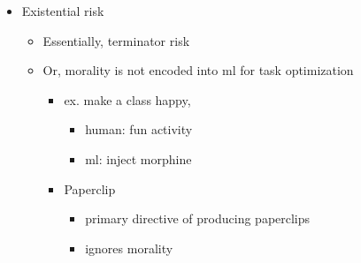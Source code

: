 \documentclass[letterpaper]{article}
\begin{document}
\begin{itemize}
\item Existential risk

\begin{itemize}
\item Essentially, terminator risk
\item Or, morality is not encoded into ml for task optimization

\begin{itemize}
\item ex. make a class happy,

\begin{itemize}
\item human: fun activity
\item ml: inject morphine
\end{itemize}

\item Paperclip

\begin{itemize}
\item primary directive of producing paperclips
\item ignores morality
\end{itemize}
\end{itemize}
\end{itemize}
\end{itemize}
\end{document}

